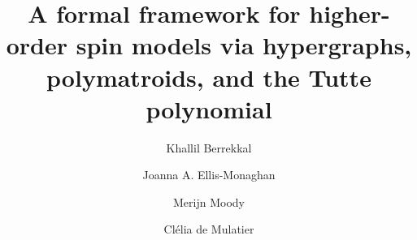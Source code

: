 \documentclass[11pt,reqno]{amsart}
\theoremstyle{plain}
\theoremstyle{definition}
\numberwithin{equation}{section}
\begin{document}
\title[Higher-order spin models via hypergraphs and the Tutte polynomial]
      {A formal framework for higher-order spin models via hypergraphs, polymatroids, and the Tutte polynomial}

\author[K. Berrekkal]{Khallil Berrekkal}
\address{Korteweg-de Vries Institute for Mathematics, University of Amsterdam,
  Science Park 105-107, 1098 XG Amsterdam, The Netherlands}

\author[J. A. Ellis-Monaghan]{Joanna A. Ellis-Monaghan}
\address{Korteweg-de Vries Institute for Mathematics, University of Amsterdam,
  Science Park 105-107, 1098 XG Amsterdam, The Netherlands}

\author[M. Moody]{Merijn Moody}
\address{Korteweg-de Vries Institute for Mathematics, University of Amsterdam,
  Science Park 105-107, 1098 XG Amsterdam, The Netherlands;
  Institute of Physics, University of Amsterdam, Science Park 904,
  1098 XH Amsterdam, The Netherlands;
  Dutch Institute for Emergent Phenomena, University of Amsterdam,
  1090 GL Amsterdam, The Netherlands}

\author[C. de Mulatier]{Cl\'elia de Mulatier}
\address{Institute for Theoretical Physics, University of Amsterdam,
  Science Park 904, 1098 XH Amsterdam, The Netherlands;
  Informatics Institute, University of Amsterdam, LAB42,
  1098 XH Amsterdam, The Netherlands;
  Dutch Institute for Emergent Phenomena, University of Amsterdam,
  1090 GL Amsterdam, The Netherlands}


\end{document}
